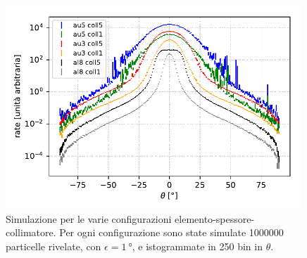 \begin{figure}
	\centering
	\includegraphics[width=30em]{immagini/mc}
	\caption{\label{fig:mc}
	Simulazione per le varie configurazioni elemento-spessore-collimatore.
	Per ogni configurazione sono state simulate \num{1000000} particelle rivelate,
	con $\epsilon=\SI{1}{\degree}$,
	e istogrammate in 250 bin in $\theta$.}
\end{figure}
